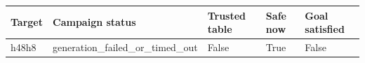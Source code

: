 {\small
\begin{tabular}{lllll}
\hline
Target & Campaign status & Trusted table & Safe now & Goal satisfied \\
\hline
h48h8 & generation\_failed\_or\_timed\_out & False & True & False \\
\hline
\end{tabular}
}
